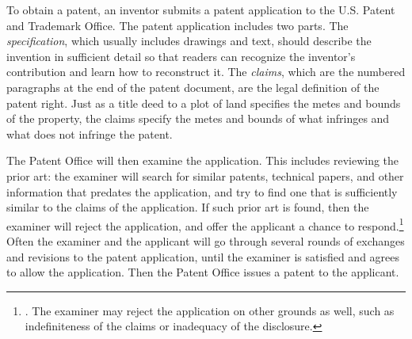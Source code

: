 \documentclass[11pt,twocolumn,titlepage]{article}
\begin{document}
To obtain a patent, an inventor submits a patent application to the U.S. Patent
and Trademark Office. The patent application includes two parts. The
\emph{specification}, which usually includes drawings and text, should describe
the invention in sufficient detail so that readers can recognize the inventor's
contribution and learn how to reconstruct it. The
\emph{claims}, which are the
numbered paragraphs at the end of the patent document, are the legal
definition of the patent right. Just as a title deed to a
plot of land specifies
the metes and bounds of the property, the claims specify the metes and bounds of
what infringes and what does not infringe the patent.

The Patent Office will then examine the application. This includes
reviewing the prior art: the examiner will search for similar
patents, technical papers, and other information that predates the application,
and try to find one that is sufficiently similar to the claims of the
application.
If such prior art is found, then the examiner will reject the
application, and offer the applicant a chance to respond.\footnote{. The examiner may reject the application on other grounds
as well, such as indefiniteness of the claims or inadequacy of the disclosure.}
Often the examiner and the applicant will go through several rounds of exchanges
and revisions to the patent application, until the examiner is satisfied and
agrees to allow the application. Then the Patent Office
issues a patent to the applicant.
\end{document}
